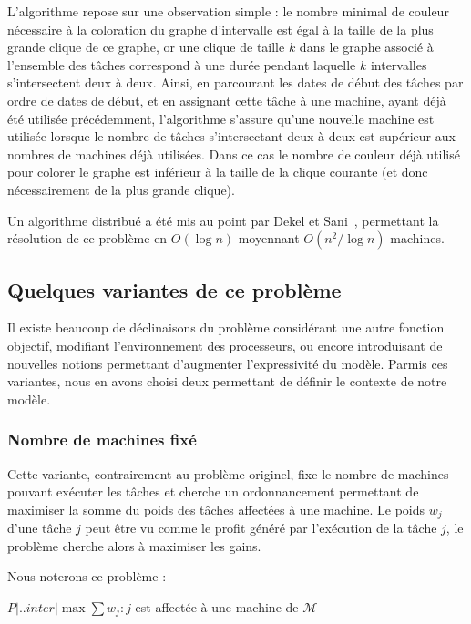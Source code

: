 \documentclass[a4paper,11pt]{article}
\begin{document}
L'algorithme repose sur une observation simple : le nombre minimal de couleur nécessaire à la
coloration du graphe d'intervalle est égal à la taille de la plus grande clique de ce graphe, or une
clique de taille $k$ dans le graphe associé à l'ensemble des tâches correspond à une durée pendant
laquelle $k$ intervalles s'intersectent deux à deux. Ainsi, en parcourant les dates de début des tâches par
ordre de dates de début, et en assignant cette tâche à une machine, ayant déjà été utilisée
précédemment, l'algorithme s'assure qu'une nouvelle machine est utilisée lorsque le nombre de
tâches s'intersectant deux à deux est supérieur aux nombres de machines déjà utilisées. Dans ce cas
le nombre de couleur déjà utilisé pour colorer le graphe est inférieur à la taille de la clique
courante (et donc nécessairement de la plus grande clique).

Un algorithme distribué a été mis au point par Dekel et Sani~\cite{dekel1983parallel}, permettant la
résolution de ce problème en $O(\log n)$ moyennant $O(n^2 / \log n)$ machines.

\subsection{Quelques variantes de ce problème}

Il existe beaucoup de déclinaisons du problème \bisched considérant une autre fonction objectif,
modifiant l'environnement des processeurs, ou encore introduisant de nouvelles notions permettant
d'augmenter l'expressivité du modèle. Parmis ces variantes, nous en avons choisi deux permettant de
définir le contexte de notre modèle.

\subsubsection{Nombre de machines fixé}

Cette variante, contrairement au problème originel, fixe le nombre de machines pouvant exécuter les
tâches et cherche un ordonnancement permettant de maximiser la somme du poids des tâches affectées à
une machine. Le poids $w_j$ d'une tâche $j$ peut être vu comme le profit généré par l'exécution de
la tâche $j$, le problème cherche alors à maximiser les gains.

Nous noterons ce problème :
\begin{center}
    $P \Big| . . inter \Big| \max \sum w_j : j$ est affectée à une machine de $\mathcal{M}$
\end{center}
\end{document}

